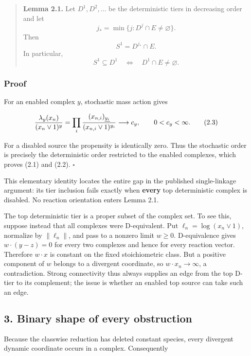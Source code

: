 \begin{quote}
\textbf{Lemma 2.1.} Let \(D^1,D^2,\ldots\) be the deterministic tiers in
decreasing order and let \[
j_* = \min\{j:D^j\cap E\ne\varnothing\}.
\] Then \[
                        S^1=D^{j_*}\cap E.                   \tag{2.1}
\] In particular, \[
       S^1\subseteq D^1\quad\Longleftrightarrow\quad
                        D^1\cap E\ne\varnothing .            \tag{2.2}
\]
\end{quote}

\subsubsection{Proof}

For an enabled complex \(y\), stochastic mass action gives

\[
 {\lambda_y(x_n)\over (x_n\vee1)^y}
   =\prod_i{(x_{n,i})_{\underline{y_i}}
          \over (x_{n,i}\vee1)^{y_i}}\longrightarrow c_y,
       \qquad 0<c_y<\infty.                                   \tag{2.3}
\]

For a disabled source the propensity is identically zero. Thus the
stochastic order is precisely the deterministic order restricted to the
enabled complexes, which proves (2.1) and (2.2). \(\square\)

This elementary identity locates the entire gap in the published
single-linkage argument: its tier inclusion fails exactly when
\textbf{every} top deterministic complex is disabled. No reaction
orientation enters Lemma 2.1.

The top deterministic tier is a proper subset of the complex set. To see
this, suppose instead that all complexes were D-equivalent. Put
\(\ell_n=\log(x_n\vee1)\), normalize by \(\|\ell_n\|\), and pass to a
nonzero limit \(w\ge0\). D-equivalence gives \(w\cdot(y-z)=0\) for every
two complexes and hence for every reaction vector. Therefore
\(w\cdot x\) is constant on the fixed stoichiometric class. But a
positive component of \(w\) belongs to a divergent coordinate, so
\(w\cdot x_n\to\infty\), a contradiction. Strong connectivity thus
always supplies an edge from the top D-tier to its complement; the issue
is whether an enabled top source can take such an edge.

\subsection{3. Binary shape of every
obstruction}

Because the classwise reduction has deleted constant species, every
divergent dynamic coordinate occurs in a complex. Consequently

